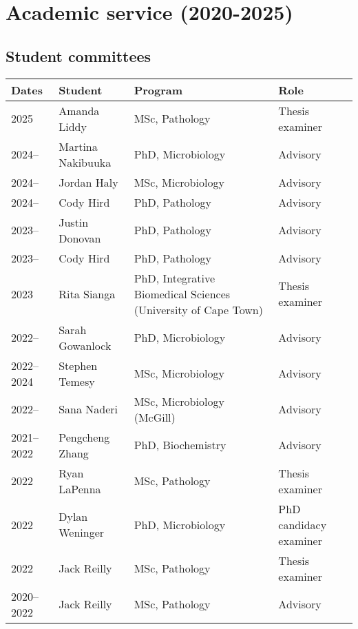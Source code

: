 
\clearpage
\section {Academic service (2020-2025)}


\subsection  {\hspace{-1in} Student committees}

\begin{tabular}{lp{1.3in}p{2.4in}p{1.4in}}
Dates & Student & Program & Role\\
\hline



2025 & Amanda Liddy & MSc, Pathology & Thesis examiner\\

2024-- & Martina Nakibuuka & PhD, Microbiology & Advisory\\

2024-- & Jordan Haly & MSc, Microbiology & Advisory\\
2024-- & Cody Hird & PhD, Pathology & Advisory\\

2023-- & Justin Donovan & PhD, Pathology & Advisory\\
2023-- & Cody Hird & PhD, Pathology & Advisory\\

2023 & Rita Sianga & PhD, Integrative Biomedical Sciences (University of Cape Town) & Thesis examiner\\

2022-- & Sarah Gowanlock & PhD, Microbiology & Advisory\\
2022--2024 & Stephen Temesy & MSc, Microbiology & Advisory\\
2022-- & Sana Naderi & MSc, Microbiology (McGill) & Advisory\\
2021--2022 & Pengcheng Zhang & PhD, Biochemistry & Advisory\\

2022 & Ryan LaPenna & MSc, Pathology & Thesis examiner\\
2022 & Dylan Weninger & PhD, Microbiology & PhD candidacy examiner\\
2022 & Jack Reilly & MSc, Pathology & Thesis examiner\\

2020--2022 & Jack Reilly & MSc, Pathology & Advisory\\


\end{tabular}
